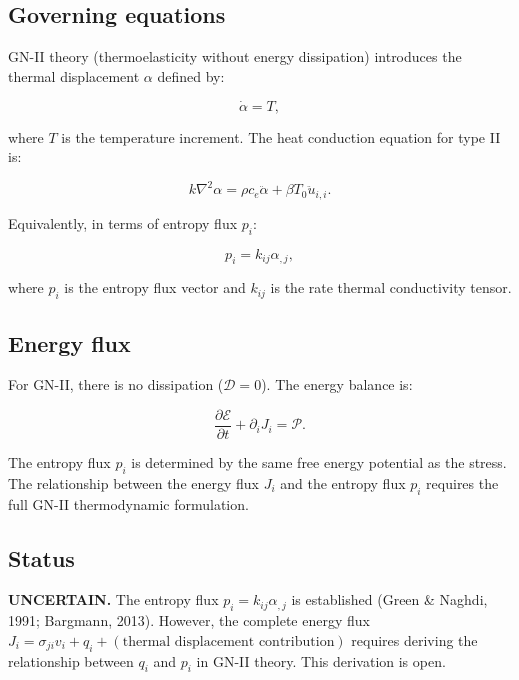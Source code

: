 \documentclass{article}
\begin{document}
\subsection{Governing equations}

GN-II theory (thermoelasticity without energy dissipation) introduces the thermal displacement $\alpha$ defined by:

\begin{equation}
\dot{\alpha} = T,
\label{ef:gn2:1}
\end{equation}

where $T$ is the temperature increment. The heat conduction equation for type II is:

\begin{equation}
k\nabla^2\alpha = \rho c_e \ddot{\alpha} + \beta T_0 \ddot{u}_{i,i}.
\label{ef:gn2:2}
\end{equation}

Equivalently, in terms of entropy flux $p_i$:

\begin{equation}
p_i = k_{ij}\alpha_{,j},
\label{ef:gn2:3}
\end{equation}

where $p_i$ is the entropy flux vector and $k_{ij}$ is the rate thermal conductivity tensor.

\subsection{Energy flux}

For GN-II, there is no dissipation ($\mathcal{D} = 0$). The energy balance is:

\begin{equation}
\frac{\partial\mathcal{E}}{\partial t} + \partial_i J_i = \mathcal{P}.
\label{ef:gn2:4}
\end{equation}

The entropy flux $p_i$ is determined by the same free energy potential as the stress. The relationship between the energy flux $J_i$ and the entropy flux $p_i$ requires the full GN-II thermodynamic formulation.

\subsection{Status}

\textbf{UNCERTAIN.} The entropy flux $p_i = k_{ij}\alpha_{,j}$ is established (Green \& Naghdi, 1991; Bargmann, 2013). However, the complete energy flux $J_i = \sigma_{ji}v_i + q_i + (\text{thermal displacement contribution})$ requires deriving the relationship between $q_i$ and $p_i$ in GN-II theory. This derivation is open.
\end{document}
